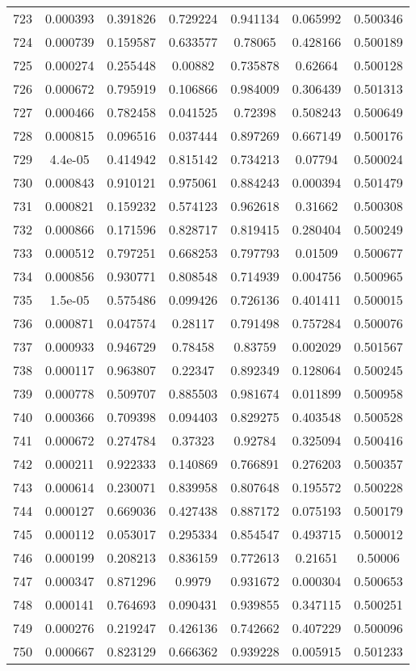 \begin{table}
\begin{tabular}{c|c|c|c|c|c|c}
723 & 0.000393 & 0.391826 & 0.729224 & 0.941134 & 0.065992 & 0.500346\\
724 & 0.000739 & 0.159587 & 0.633577 & 0.78065 & 0.428166 & 0.500189\\
725 & 0.000274 & 0.255448 & 0.00882 & 0.735878 & 0.62664 & 0.500128\\
726 & 0.000672 & 0.795919 & 0.106866 & 0.984009 & 0.306439 & 0.501313\\
727 & 0.000466 & 0.782458 & 0.041525 & 0.72398 & 0.508243 & 0.500649\\
728 & 0.000815 & 0.096516 & 0.037444 & 0.897269 & 0.667149 & 0.500176\\
729 & 4.4e-05 & 0.414942 & 0.815142 & 0.734213 & 0.07794 & 0.500024\\
730 & 0.000843 & 0.910121 & 0.975061 & 0.884243 & 0.000394 & 0.501479\\
731 & 0.000821 & 0.159232 & 0.574123 & 0.962618 & 0.31662 & 0.500308\\
732 & 0.000866 & 0.171596 & 0.828717 & 0.819415 & 0.280404 & 0.500249\\
733 & 0.000512 & 0.797251 & 0.668253 & 0.797793 & 0.01509 & 0.500677\\
734 & 0.000856 & 0.930771 & 0.808548 & 0.714939 & 0.004756 & 0.500965\\
735 & 1.5e-05 & 0.575486 & 0.099426 & 0.726136 & 0.401411 & 0.500015\\
736 & 0.000871 & 0.047574 & 0.28117 & 0.791498 & 0.757284 & 0.500076\\
737 & 0.000933 & 0.946729 & 0.78458 & 0.83759 & 0.002029 & 0.501567\\
738 & 0.000117 & 0.963807 & 0.22347 & 0.892349 & 0.128064 & 0.500245\\
739 & 0.000778 & 0.509707 & 0.885503 & 0.981674 & 0.011899 & 0.500958\\
740 & 0.000366 & 0.709398 & 0.094403 & 0.829275 & 0.403548 & 0.500528\\
741 & 0.000672 & 0.274784 & 0.37323 & 0.92784 & 0.325094 & 0.500416\\
742 & 0.000211 & 0.922333 & 0.140869 & 0.766891 & 0.276203 & 0.500357\\
743 & 0.000614 & 0.230071 & 0.839958 & 0.807648 & 0.195572 & 0.500228\\
744 & 0.000127 & 0.669036 & 0.427438 & 0.887172 & 0.075193 & 0.500179\\
745 & 0.000112 & 0.053017 & 0.295334 & 0.854547 & 0.493715 & 0.500012\\
746 & 0.000199 & 0.208213 & 0.836159 & 0.772613 & 0.21651 & 0.50006\\
747 & 0.000347 & 0.871296 & 0.9979 & 0.931672 & 0.000304 & 0.500653\\
748 & 0.000141 & 0.764693 & 0.090431 & 0.939855 & 0.347115 & 0.500251\\
749 & 0.000276 & 0.219247 & 0.426136 & 0.742662 & 0.407229 & 0.500096\\
750 & 0.000667 & 0.823129 & 0.666362 & 0.939228 & 0.005915 & 0.501233\\
\end{tabular}
\end{table}
